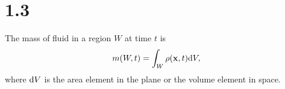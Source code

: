 \section{1.3}
\label{sec:1.3}

\begin{prop}
  The mass of fluid in a region $W$ at time $t$ is
  \begin{equation}
    \label{eq:totalMass}
    m(W,t) = \int_W\rho(\mathbf{x},t)\mathrm{d} V,
  \end{equation}
  where $\mathrm{d} V$ is the area element in the plane
  or the volume element in space.
\end{prop}

